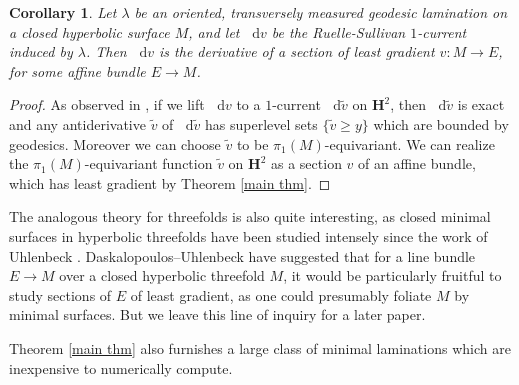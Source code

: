 \documentclass[reqno,12pt,letterpaper]{amsart}
\newcommand{\Hyp}{\mathbf H}
\newcommand*\dif{\mathop{}\!\mathrm{d}}
\newtheorem{corollary}[theorem]{Corollary}
\theoremstyle{definition}
\numberwithin{equation}{section}
\begin{document}
\begin{corollary}\label{ruelle sullivan antiderivative}
Let $\lambda$ be an oriented, transversely measured geodesic lamination on a closed hyperbolic surface $M$, and let $\dif v$ be the Ruelle-Sullivan $1$-current induced by $\lambda$.
Then $\dif v$ is the derivative of a section of least gradient $v: M \to E$, for some affine bundle $E \to M$.
\end{corollary}
\begin{proof}
As observed in \cite[\S9]{daskalopoulos2020transverse}, if we lift $\dif v$ to a $1$-current $\dif \tilde v$ on $\Hyp^2$, then $\dif \tilde v$ is exact and any antiderivative $\tilde v$ of $\dif \tilde v$ has superlevel sets $\{\tilde v \geq y\}$ which are bounded by geodesics.
Moreover we can choose $\tilde v$ to be $\pi_1(M)$-equivariant.
We can realize the $\pi_1(M)$-equivariant function $\tilde v$ on $\Hyp^2$ as a section $v$ of an affine bundle, which has least gradient by Theorem \ref{main thm}.
\end{proof}

The analogous theory for threefolds is also quite interesting, as closed minimal surfaces in hyperbolic threefolds have been studied intensely since the work of Uhlenbeck \cite{Uhlenbeck1983ClosedMS}.
Daskalopoulos--Uhlenbeck have suggested \cite[Problem 9.13]{daskalopoulos2020transverse} that for a line bundle $E \to M$ over a closed hyperbolic threefold $M$, it would be particularly fruitful to study sections of $E$ of least gradient, as one could presumably foliate $M$ by minimal surfaces.
But we leave this line of inquiry for a later paper.

Theorem \ref{main thm} also furnishes a large class of minimal laminations which are inexpensive to numerically compute.
\end{document}
